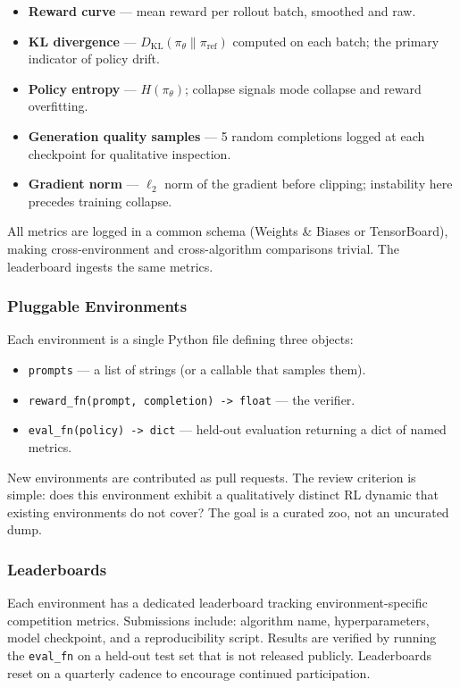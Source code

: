 \begin{itemize}
  \item \textbf{Reward curve} --- mean reward per rollout batch, smoothed and raw.
  \item \textbf{KL divergence} --- $D_{\mathrm{KL}}(\pi_\theta \| \pi_{\mathrm{ref}})$ computed on each batch; the primary indicator of policy drift.
  \item \textbf{Policy entropy} --- $H(\pi_\theta)$; collapse signals mode collapse and reward overfitting.
  \item \textbf{Generation quality samples} --- 5 random completions logged at each checkpoint for qualitative inspection.
  \item \textbf{Gradient norm} --- $\ell_2$ norm of the gradient before clipping; instability here precedes training collapse.
\end{itemize}

All metrics are logged in a common schema (Weights \& Biases or TensorBoard), making cross-environment and cross-algorithm comparisons trivial. The leaderboard ingests the same metrics.

\subsubsection{Pluggable Environments}

Each environment is a single Python file defining three objects:

\begin{itemize}
  \item \texttt{prompts} --- a list of strings (or a callable that samples them).
  \item \texttt{reward\_fn(prompt, completion) -> float} --- the verifier.
  \item \texttt{eval\_fn(policy) -> dict} --- held-out evaluation returning a dict of named metrics.
\end{itemize}

New environments are contributed as pull requests. The review criterion is simple: does this environment exhibit a qualitatively distinct RL dynamic that existing environments do not cover? The goal is a curated zoo, not an uncurated dump.

\subsubsection{Leaderboards}

Each environment has a dedicated leaderboard tracking environment-specific competition metrics. Submissions include: algorithm name, hyperparameters, model checkpoint, and a reproducibility script. Results are verified by running the \texttt{eval\_fn} on a held-out test set that is not released publicly. Leaderboards reset on a quarterly cadence to encourage continued participation.


